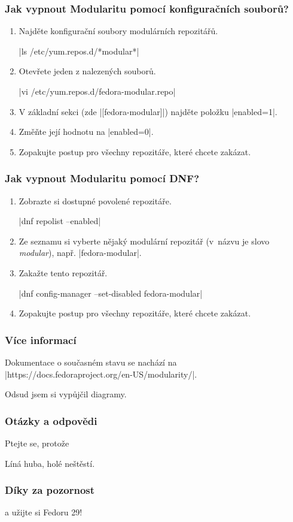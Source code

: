 \documentclass[12pt]{beamer}
\begin{document}
\begin{frame}[fragile]
\frametitle{Jak vypnout Modularitu pomocí konfiguračních souborů?}

\begin{enumerate}
	\item Najděte konfigurační soubory modulárních repozitářů.
	
	\tc|ls /etc/yum.repos.d/*modular*|
	\item Otevřete jeden z nalezených souborů.
	
	\tc|vi /etc/yum.repos.d/fedora-modular.repo|
	\item V základní sekci (zde \tc|[fedora-modular]|) najděte položku \tc|enabled=1|.
	\item Změňte její hodnotu na \tc|enabled=0|.
	\item Zopakujte postup pro všechny repozitáře, které chcete zakázat.
\end{enumerate}
\end{frame}

\begin{frame}[fragile]
\frametitle{Jak vypnout Modularitu pomocí DNF?}

\begin{enumerate}
	\item Zobrazte si dostupné povolené repozitáře.
	
	\tc|dnf repolist --enabled|
	\item Ze seznamu si vyberte nějaký modulární repozitář (v~názvu je slovo \textit{modular}), např. \tc|fedora-modular|.
	\item Zakažte tento repozitář.
	
	\tc|dnf config-manager --set-disabled fedora-modular|
	\item Zopakujte postup pro všechny repozitáře, které chcete zakázat.
\end{enumerate}
\end{frame}

\begin{frame}[fragile]
\frametitle{Více informací}
	Dokumentace o současném stavu se nachází na \tc|https://docs.fedoraproject.org/en-US/modularity/|.
	
	Odsud jsem si vypůjčil diagramy.
\end{frame}

\begin{frame}
\frametitle{Otázky a odpovědi}

Ptejte se, protože

\begin{center}
	\Huge{Líná huba, holé neštěstí.}
\end{center}
\end{frame}

\begin{frame}
\frametitle{Díky za pozornost}
\begin{center}
	\Huge{a užijte si Fedoru 29!}
\end{center}
\end{frame}
\end{document}
